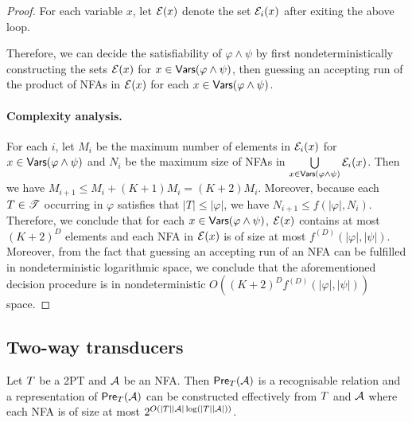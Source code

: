 \begin{proof}
For each variable $x$, let $\mathcal{E}(x)$ denote the set $\mathcal{E}_i(x)$ after exiting the above loop.

Therefore, we can decide the satisfiability of $\varphi \wedge \psi$ by first nondeterministically constructing the sets $\mathcal{E}(x)$ for $x \in \mathsf{Vars}(\varphi \wedge \psi)$, then guessing an accepting run of the product of NFAs in $\mathcal{E}(x)$ for each $x \in \mathsf{Vars}(\varphi \wedge \psi)$.

\paragraph{Complexity analysis.} For each $i$, let $M_i$ be the maximum number of elements in $\mathcal{E}_i(x)$ for $x  \in \mathsf{Vars}(\varphi \wedge \psi)$ and $N_i$ be the maximum size of NFAs in $\bigcup \limits_{x \in \mathsf{Vars}(\varphi \wedge \psi)} \mathcal{E}_i(x)$. Then we have $M_{i+1} \le M_i + (K+1)M_i = (K+2) M_i$. Moreover,  because each $T \in \mathscr{T}$ occurring in $\varphi$ satisfies that $|T| \le |\varphi|$, we have $N_{i+1} \le f(|\varphi|, N_i)$. Therefore, we conclude that for each $x \in \mathsf{Vars}(\varphi \wedge \psi)$, $\mathcal{E}(x)$ contains at most $(K+2)^D$ elements and each NFA in $\mathcal{E}(x)$ is of size at most $f^{(D)}(|\varphi|, |\psi|)$. Moreover, from the fact that guessing an accepting run of an NFA can be fulfilled in nondeterministic logarithmic space, we conclude that the aforementioned decision procedure is in nondeterministic $O((K+2)^D f^{(D)}(|\varphi|, |\psi|))$ space.
\end{proof}

\subsection{Two-way transducers}



\begin{lemma}\label{lem-2pt}
Let $T$ be a 2PT and $\mathcal{A}$ be an NFA. Then $\textsf{Pre}_{T}(\mathcal{A})$ is a recognisable relation and a representation of $\textsf{Pre}_{T}(\mathcal{A})$ can be constructed effectively from $T$ and $\mathcal{A}$ where each NFA is of size at most $2^{O(|T||\mathcal{A}|\log (|T||\mathcal{A}|))}$.
\end{lemma}

